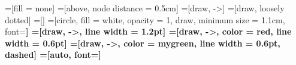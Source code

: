 \usetikzlibrary{positioning}
=[fill = none]
=[above, node distance = 0.5cm]
=[draw, ->]
=[draw, loosely dotted]
=[]
=[circle, fill = white, opacity = 1, draw, minimum size = 1.1cm, font=\bfseries]
=[draw, ->, line width = 1.2pt]
=[draw, ->, color = red, line width = 0.6pt]
=[draw, ->, color = mygreen, line width = 0.6pt, dashed]
=[auto, font=\small]